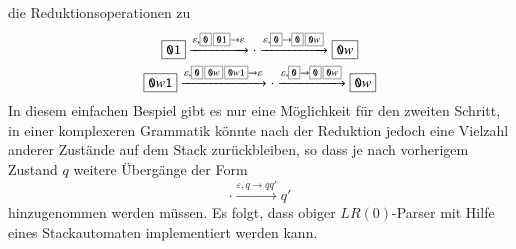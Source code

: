 die Reduktionsoperationen zu
\begin{gather*}
\boxed{\texttt{01}}
\xrightarrow{\varepsilon,\scalebox{0.7}{\boxed{\texttt{0}}\,\boxed{\texttt{01}}}\to\varepsilon}
\cdot
\xrightarrow{\varepsilon,\scalebox{0.7}{\boxed{\texttt{0}}}\to\scalebox{0.7}{\boxed{\texttt{0}}\,\boxed{\texttt{0}w}}}
\boxed{\texttt{0}w}
\\
\boxed{\texttt{0}w\texttt{1}}
\xrightarrow{\varepsilon,\scalebox{0.7}{\boxed{\texttt{0}}\,\boxed{\texttt{0}w}\,\boxed{\texttt{0}w\texttt{1}}}\to\varepsilon}
\cdot
\xrightarrow{\varepsilon,\scalebox{0.7}{\boxed{\texttt{0}}}\to\scalebox{0.7}{\boxed{\texttt{0}}\,\boxed{\texttt{0}w}}}
\boxed{\texttt{0}w}
\end{gather*}
In diesem einfachen Bespiel gibt es nur eine Möglichkeit für den zweiten
Schritt, in einer komplexeren Grammatik könnte nach der Reduktion jedoch
eine Vielzahl anderer Zustände auf dem Stack zurückbleiben, so dass je
nach vorherigem Zustand $q$ weitere Übergänge der Form
\[
\cdot\xrightarrow{\varepsilon,q\to q q'}q'
\]
hinzugenommen werden müssen. Es folgt, dass obiger $LR(0)$-Parser mit
Hilfe eines Stackautomaten implementiert werden kann.

